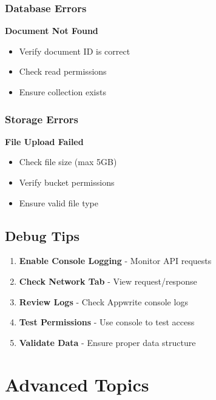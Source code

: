 \documentclass[11pt,a4paper,oneside]{book}
\begin{document}
\subsection{Database Errors}

\begin{warningbox}
\textbf{Document Not Found}
\begin{itemize}
    \item Verify document ID is correct
    \item Check read permissions
    \item Ensure collection exists
\end{itemize}
\end{warningbox}

\subsection{Storage Errors}

\begin{warningbox}
\textbf{File Upload Failed}
\begin{itemize}
    \item Check file size (max 5GB)
    \item Verify bucket permissions
    \item Ensure valid file type
\end{itemize}
\end{warningbox}

\section{Debug Tips}

\begin{enumerate}
    \item \textbf{Enable Console Logging} - Monitor API requests
    \item \textbf{Check Network Tab} - View request/response
    \item \textbf{Review Logs} - Check Appwrite console logs
    \item \textbf{Test Permissions} - Use console to test access
    \item \textbf{Validate Data} - Ensure proper data structure
\end{enumerate}

\chapter{Advanced Topics}
\end{document}
